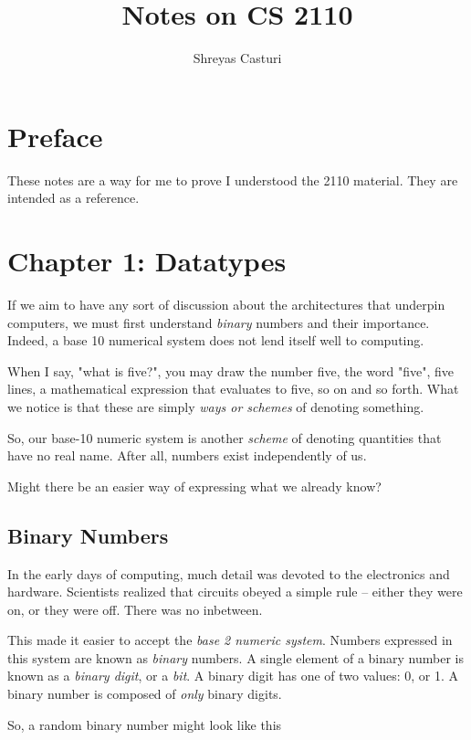 \documentclass[12pt]{article}
\title{Notes on CS 2110}
\author{Shreyas Casturi}
\begin{document}
\maketitle

\newpage

\section*{Preface}
These notes are a way for me to prove I understood the 2110 material.  They are intended as a reference.

\newpage

\section*{Chapter 1: Datatypes}

If we aim to have any sort of discussion about the architectures that underpin computers, we must first
understand \textit{binary} numbers and their importance. Indeed, a base 10 numerical system does not lend itself well to computing.

When I say, "what is five?", you may draw the number five, the word "five", five lines, a mathematical expression that evaluates to five, so on and so forth.
What we notice is that these are simply \textit{ways or schemes} of denoting something.

So, our base-10 numeric system is another \textit{scheme} of denoting quantities that have no real name. After all, numbers exist independently of us.

Might there be an easier way of expressing what we already know?

\subsection*{Binary Numbers}

In the early days of computing, much detail was devoted to the electronics and hardware. Scientists realized that circuits
obeyed a simple rule -- either they were on, or they were off. There was no inbetween.

This made it easier to accept the \textit{base 2 numeric system}. Numbers expressed in this system are
known as \textit{binary} numbers. A single element
of a binary number is known as a \textit{binary digit}, or a \textit{bit}. A binary
digit has one of two values: 0, or 1. A binary number
is composed of \textit{only} binary digits.

So, a random binary number might look like this
\end{document}

